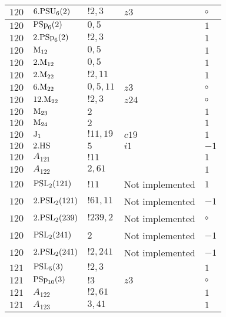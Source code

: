 \documentclass[a4paper, 11pt]{article}
\begin{document}
\begin{longtable}{lllll}
        $ 120 $ & $ 6.{\rm PSU}_{6}(2) $ & $ ! 2,3 $ & $ z3 $ &  $\circ$ \\ \hline
        $ 120 $ & $ {\rm PSp}_{6}(2) $ & $ 0,5 $ & $ ~ $ & $ 1$ \\ \hline
        $ 120 $ & $ 2.{\rm PSp}_{6}(2) $ & $ ! 2,3 $ & $ ~ $ & $ 1$ \\ \hline
        $ 120 $ & $ {\rm M}_{12} $ & $ 0,5 $ & $ ~ $ & $ 1$ \\ \hline
        $ 120 $ & $ 2.{\rm M}_{12} $ & $ 0,5 $ & $ ~ $ & $ 1$ \\ \hline
        $ 120 $ & $ 2.{\rm M}_{22} $ & $ ! 2,11 $ & $ ~ $ & $ 1$ \\ \hline
        $ 120 $ & $ 6.{\rm M}_{22} $ & $ 0,5,11 $ & $ z3 $ &  $\circ$ \\ \hline
        $ 120 $ & $ 12.{\rm M}_{22} $ & $ ! 2,3 $ & $ z24 $ &  $\circ$ \\ \hline
        $ 120 $ & $ {\rm M}_{23} $ & $ 2 $ & $ ~ $ & $ 1$ \\ \hline
        $ 120 $ & $ {\rm M}_{24} $ & $ 2 $ & $ ~ $ & $ 1$ \\ \hline
        $ 120 $ & $ {\rm J}_1 $ & $ ! 11,19 $ & $ c19 $ & $ 1$ \\ \hline
        $ 120 $ & $ 2.{\rm HS} $ & $ 5 $ & $ i1 $ & $ -1$ \\ \hline
        $ 120 $ & $ A_{121} $ & $ !11 $ & $ ~ $ & $ 1$ \\ \hline
        $ 120 $ & $ A_{122} $ & $ 2, 61 $ & $ ~ $ & $ 1$ \\ \hline
        $ 120 $ & $ {\rm PSL}_{2}(121) $ & $ !11 $ &  Not implemented & $ 1$ \\ \hline
        $ 120 $ & $ 2.{\rm PSL}_{2}(121) $ & $ !61, 11 $ &  Not implemented & $ -1$ \\ \hline
        $ 120 $ & $ 2.{\rm PSL}_{2}(239) $ & $ !239, 2 $ &  Not implemented &  $\circ$ \\ \hline
        $ 120 $ & $ {\rm PSL}_{2}(241) $ & $ 2 $ &  Not implemented & $ -1$ \\ \hline
        $ 120 $ & $ 2.{\rm PSL}_{2}(241) $ & $ !2, 241 $ &  Not implemented & $ -1$ \\ \hline
        $ 121 $ & $ {\rm PSL}_{5}(3) $ & $ ! 2,3 $ & $ ~ $ & $ 1$ \\ \hline
        $ 121 $ & $ {\rm PSp}_{10}(3) $ & $ ! 3 $ & $ z3 $ &  $\circ$ \\ \hline
        $ 121 $ & $ A_{122} $ & $ !2, 61 $ & $ ~ $ & $ 1$ \\ \hline
        $ 121 $ & $ A_{123} $ & $ 3, 41 $ & $ ~ $ & $ 1$ \\ \hline

\end{longtable}
\end{document}
